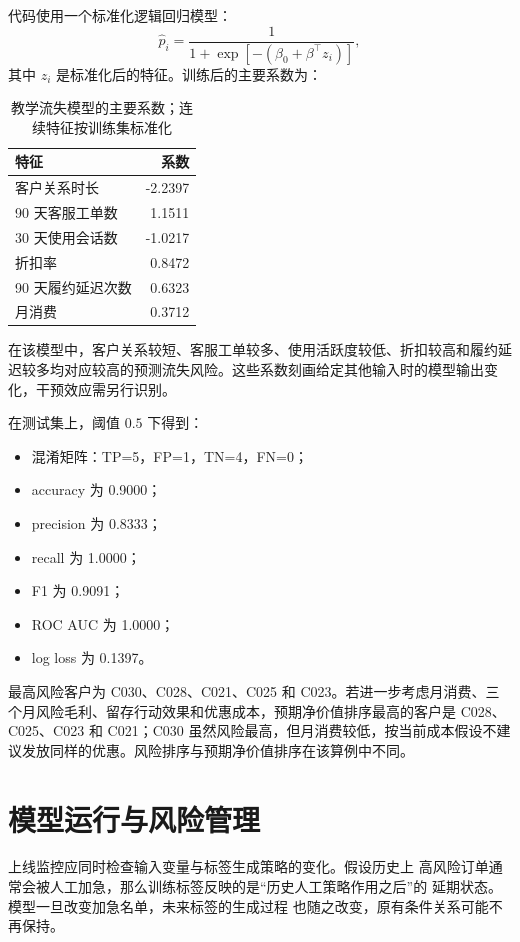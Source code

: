 代码使用一个标准化逻辑回归模型：
\[
  \hat p_i
  =
  \frac{1}{1+\exp[-(\beta_0+\beta^\top z_i)]},
\]
其中 \(z_i\) 是标准化后的特征。训练后的主要系数为：
\begin{table}[htbp]
\centering
\caption{教学流失模型的主要系数；连续特征按训练集标准化}
\begin{tabular}{lr}
\toprule
\rowcolor{BDMTableHead}
特征 & 系数\\
\midrule
客户关系时长 & -2.2397\\
90 天客服工单数 & 1.1511\\
30 天使用会话数 & -1.0217\\
折扣率 & 0.8472\\
90 天履约延迟次数 & 0.6323\\
月消费 & 0.3712\\
\bottomrule
\end{tabular}
\end{table}
在该模型中，客户关系较短、客服工单较多、使用活跃度较低、折扣较高和履约延迟较多均对应较高的预测流失风险。这些系数刻画给定其他输入时的模型输出变化，干预效应需另行识别。

在测试集上，阈值 \(0.5\) 下得到：
\begin{itemize}
  \item 混淆矩阵：TP=5，FP=1，TN=4，FN=0；
  \item accuracy 为 0.9000；
  \item precision 为 0.8333；
  \item recall 为 1.0000；
  \item F1 为 0.9091；
  \item ROC AUC 为 1.0000；
  \item log loss 为 0.1397。
\end{itemize}

最高风险客户为 C030、C028、C021、C025 和 C023。若进一步考虑月消费、三个月风险毛利、留存行动效果和优惠成本，预期净价值排序最高的客户是 C028、C025、C023 和 C021；C030 虽然风险最高，但月消费较低，按当前成本假设不建议发放同样的优惠。风险排序与预期净价值排序在该算例中不同。

\section{模型运行与风险管理}

上线监控应同时检查输入变量与标签生成策略的变化。假设历史上
高风险订单通常会被人工加急，那么训练标签反映的是“历史人工策略作用之后”的
延期状态。模型一旦改变加急名单，未来标签的生成过程
也随之改变，原有条件关系可能不再保持。

